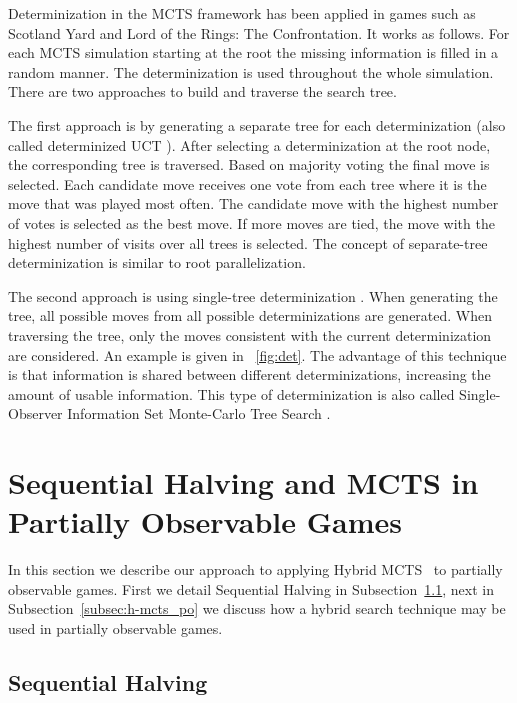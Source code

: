 \documentclass[a4paper]{llncs}
\begin{document}
Determinization in the MCTS framework has been applied in games such as Scotland Yard and Lord of the Rings: The Confrontation. It works as follows. For each MCTS simulation starting at the root the missing information  is filled in a  random manner. The determinization is used throughout the whole simulation. There are two approaches to build and traverse the search tree. 

The first approach is by generating a separate tree for each determinization (also called determinized UCT \cite{cowling2012}). After selecting a determinization at the root node, the corresponding tree is traversed. Based on majority voting \cite{SoejimaKW10} the final move is selected. Each candidate move receives one vote from each tree where it is the move that was played most often. The candidate move with the highest number of votes is selected
as the best move. If more moves are tied, the move with the highest number of visits
over all trees is selected. The concept of separate-tree determinization is similar to root parallelization.

The second approach is using single-tree determinization \cite{ciancarini10,cowling2012,nijssen12tciaig}. When generating the tree, all possible moves from all possible determinizations are generated. When traversing the tree, only the moves consistent with the current determinization are considered. An example is given in \figurename~\ref{fig:det}. The advantage of this technique is that information is shared between different determinizations, increasing the amount of usable information. This type of determinization is  also called Single-Observer Information Set Monte-Carlo Tree Search \cite{cowling2012}.

\section{Sequential Halving and MCTS in Partially Observable Games}
\label{sec:h-mcts}

In this section we describe our approach to applying Hybrid MCTS~\cite{Pepels14hmcts} to partially observable games. First we detail Sequential Halving in Subsection~\ref{subsec:seq_halving}, next in Subsection~\ref{subsec:h-mcts_po} we discuss how a hybrid search technique may be used in partially observable games.

\subsection{Sequential Halving}
\label{subsec:seq_halving}
\end{document}
